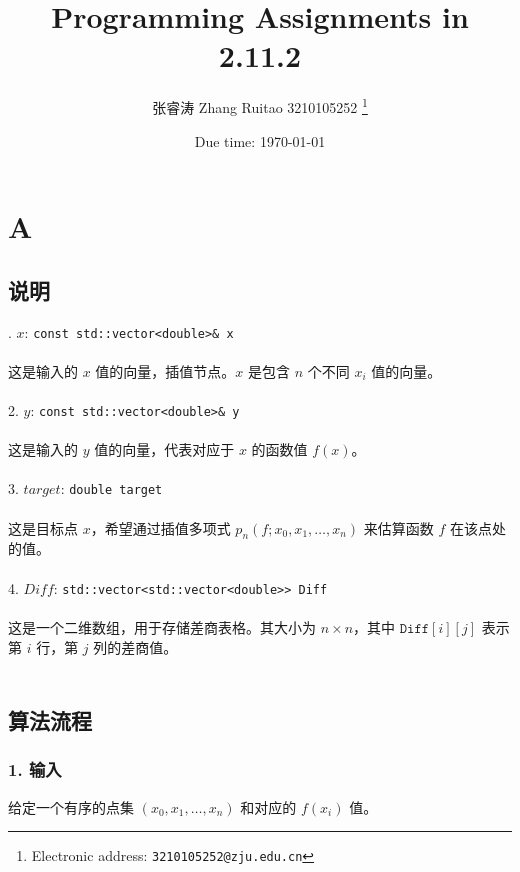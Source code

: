 \documentclass[a4paper]{article}
\begin{document}
\title{Programming Assignments in 2.11.2}

\author{张睿涛 Zhang Ruitao 3210105252
  \thanks{Electronic address: \texttt{3210105252@zju.edu.cn}}}


\date{Due time: \today}

\maketitle



\section*{A}
\subsection*{说明}
. $x$: \texttt{const std::vector<double>\& x} \\
\\
这是输入的 $x$ 值的向量，插值节点。$x$ 是包含 $n$ 个不同 $x_i$ 值的向量。\\
\\
2. $y$: \texttt{const std::vector<double>\& y} \\
\\
这是输入的 $y$ 值的向量，代表对应于 $x$ 的函数值 $f(x)$。\\
\\
3. $target$: \texttt{double target}\\
\\
这是目标点 $x$，希望通过插值多项式 $p_n(f; x_0, x_1, \dots, x_n)$ 来估算函数 $f$ 在该点处的值。\\
\\
4. $Diff$: \texttt{std::vector<std::vector<double>> Diff}\\
\\
这是一个二维数组，用于存储差商表格。其大小为 $n \times n$，其中 $\texttt{Diff}[i][j]$ 表示第 $i$ 行，第 $j$ 列的差商值。\\
\\
\subsection*{算法流程}
\subsubsection*{1. 输入}
给定一个有序的点集 $(x_0, x_1, \dots, x_n)$ 和对应的 $f(x_i)$ 值。
\end{document}
